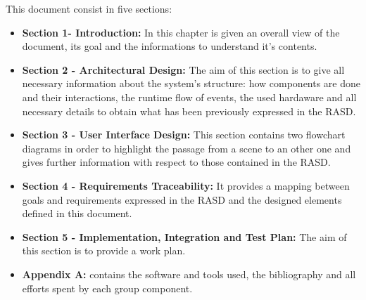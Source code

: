 This document consist in five sections:
\begin{itemize}
	\item \textbf{Section 1- Introduction:} In this chapter is given an overall view of the document, its goal and the informations to understand it's contents.
	\item \textbf{Section 2 - Architectural Design:} The aim of this section is to give all necessary information about the system's 			structure: how components are done and their interactions, the runtime flow of events, the used hardaware and all necessary 		details to obtain what has been previously expressed in the RASD.
	\item \textbf{Section 3 - User Interface Design:} This section contains two flowchart diagrams in order to highlight the passage 		from a scene to an other one and gives further information with respect to those contained in the RASD.
	\item \textbf{Section 4 - Requirements Traceability:} It provides a mapping between goals and requirements expressed in the 			RASD and the designed elements defined in this document.
	\item \textbf{Section 5 - Implementation, Integration and Test Plan:} The aim of this section is to provide a work plan.
	\item \textbf{Appendix A:} contains the software and tools used, the bibliography and all efforts spent by each group component. 
\end{itemize}